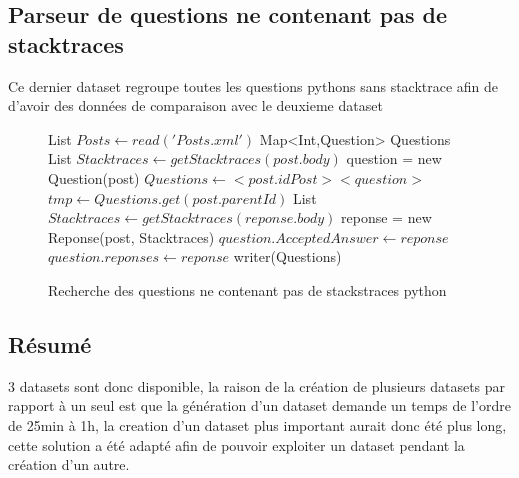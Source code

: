 \subsection{Parseur de questions ne contenant pas de stacktraces}
Ce dernier dataset regroupe toutes les questions pythons sans stacktrace afin de d'avoir des données de comparaison avec le deuxieme dataset
\begin{figure}[!h]
\begin{center}
\begin{algorithmic}
	\State List $Posts \gets read('Posts.xml')$
	\State Map<Int,Question> Questions
			\State List $Stacktraces \gets getStacktraces(post.body)$
				\State question = new Question(post)
				\State $Questions \gets <post.idPost><question>$
			\EndIf
		\Else {}
			\State $tmp\gets Questions.get(post.parentId)$
				\State List $Stacktraces \gets getStacktraces(reponse.body)$
				\State reponse = new Reponse(post, Stacktraces)
					\State $question.AcceptedAnswer \gets reponse$
				\Else
					\State $question.reponses \gets reponse$
				\EndIf
			\EndIf
		\EndIf
		\EndIf
	\EndFor
	\State writer(Questions)
\EndFunction
\end{algorithmic}
\caption{Recherche des questions ne contenant pas de stackstraces python}
\label{Recherche des questions ne contenant pas de stackstraces python}
\end{center}
\end{figure}
\subsection{Résumé}
3 datasets sont donc disponible, la raison de la création de plusieurs datasets par rapport à un seul est que la génération d'un dataset demande un temps de l'ordre de 25min à 1h, la creation d'un dataset plus important aurait donc été plus long, cette solution a été adapté afin de pouvoir exploiter un dataset pendant la création d'un autre.